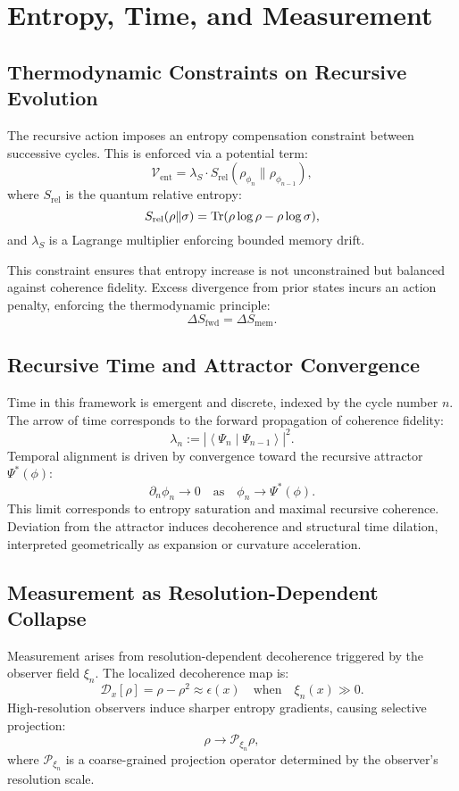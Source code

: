 \section{Entropy, Time, and Measurement}

\subsection{Thermodynamic Constraints on Recursive Evolution}

The recursive action imposes an entropy compensation constraint between successive cycles. This is enforced via a potential term:
\[
\mathcal{V}_{\text{ent}} = \lambda_S \cdot S_{\text{rel}}(\rho_{\phi_n} \| \rho_{\phi_{n-1}}),
\]
where $S_{\text{rel}}$ is the quantum relative entropy:
\[
S_{\text{rel}}(\rho \| \sigma) = \Tr(\rho \log \rho - \rho \log \sigma),
\]
and $\lambda_S$ is a Lagrange multiplier enforcing bounded memory drift.

This constraint ensures that entropy increase is not unconstrained but balanced against coherence fidelity. Excess divergence from prior states incurs an action penalty, enforcing the thermodynamic principle:
\[
\Delta S_{\text{fwd}} = \Delta S_{\text{mem}}.
\]

\subsection{Recursive Time and Attractor Convergence}

Time in this framework is emergent and discrete, indexed by the cycle number $n$. The arrow of time corresponds to the forward propagation of coherence fidelity:
\[
\lambda_n := \left| \left\langle \Psi_n \middle| \Psi_{n-1} \right\rangle \right|^2.
\]
Temporal alignment is driven by convergence toward the recursive attractor $\Psi^*(\phi)$:
\[
\partial_n \phi_n \to 0 \quad \text{as} \quad \phi_n \to \Psi^*(\phi).
\]
This limit corresponds to entropy saturation and maximal recursive coherence. Deviation from the attractor induces decoherence and structural time dilation, interpreted geometrically as expansion or curvature acceleration.

\subsection{Measurement as Resolution-Dependent Collapse}

Measurement arises from resolution-dependent decoherence triggered by the observer field $\xi_n$. The localized decoherence map is:
\[
\mathcal{D}_x[\rho] = \rho - \rho^2 \approx \epsilon(x) \quad \text{when} \quad \xi_n(x) \gg 0.
\]
High-resolution observers induce sharper entropy gradients, causing selective projection:
\[
\rho \to \mathcal{P}_{\xi_n} \rho,
\]
where $\mathcal{P}_{\xi_n}$ is a coarse-grained projection operator determined by the observer's resolution scale.

